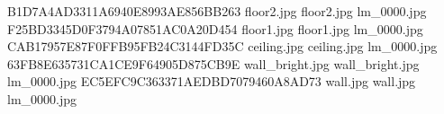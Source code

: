 B1D7A4AD3311A6940E8993AE856BB263 floor2.jpg floor2.jpg lm_0000.jpg
F25BD3345D0F3794A07851AC0A20D454 floor1.jpg floor1.jpg lm_0000.jpg
CAB17957E87F0FFB95FB24C3144FD35C ceiling.jpg ceiling.jpg lm_0000.jpg
63FB8E635731CA1CE9F64905D875CB9E wall_bright.jpg wall_bright.jpg lm_0000.jpg
EC5EFC9C363371AEDBD7079460A8AD73 wall.jpg wall.jpg lm_0000.jpg